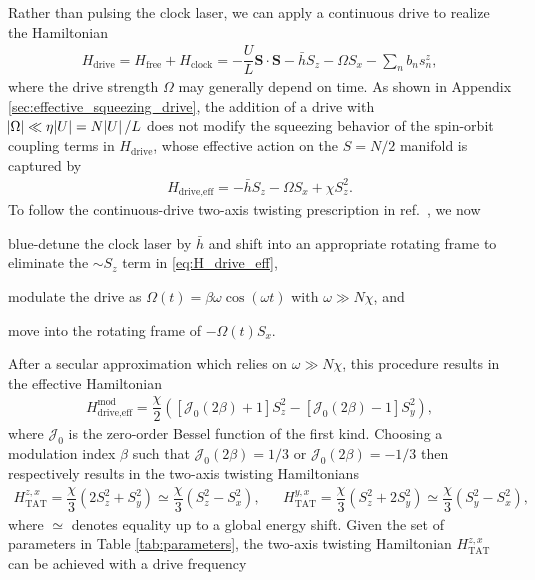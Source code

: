 \documentclass[aps,notitlepage,nofootinbib,11pt]{revtex4-1}
\renewcommand{\t}{\text} %
\newcommand{\f}[2]{\dfrac{#1}{#2}} %
\newcommand{\p}[1]{\left(#1\right)} %
\renewcommand{\sp}[1]{\left[#1\right]} %
\renewcommand{\v}{\bm} %
\renewcommand{\c}{\cdot} %
\newcommand{\J}{\mathcal{J}}
\newcommand{\1}{\hat{\mathds{1}}}
\begin{document}
Rather than pulsing the clock laser, we can apply a continuous drive
to realize the Hamiltonian
\begin{align}
  H_{\t{drive}} = H_{\t{free}} + H_{\t{clock}}
  = -\f{U}{L} \v S\c\v S - \bar h S_z - \Omega S_x - \sum_n b_n s_n^z,
\end{align}
where the drive strength $\Omega$ may generally depend on time.  As
shown in Appendix \ref{sec:effective_squeezing_drive}, the addition of
a drive with $\abs{\Omega}\ll\eta\abs{U}=N\abs{U}/L$ does not modify
the squeezing behavior of the spin-orbit coupling terms in
$H_{\t{drive}}$, whose effective action on the $S=N/2$ manifold is
captured by
\begin{align}
  H_{\t{drive,eff}} = -\bar h S_z - \Omega S_x + \chi S_z^2.
  \label{eq:H_drive_eff}
\end{align}
To follow the continuous-drive two-axis twisting prescription in
ref.~\cite{huang2015twoaxis}, we now
\begin{enumerate*}[label=(\roman*)]
\item blue-detune the clock laser by $\bar h$ and shift into an
  appropriate rotating frame to eliminate the $\sim S_z$ term in
  \eqref{eq:H_drive_eff},
\item modulate the drive as $\Omega\p{t}=\beta\omega\cos\p{\omega t}$
  with $\omega\gg N\chi$, and
\item move into the rotating frame of $-\Omega\p{t}S_x$.
\end{enumerate*}
After a secular approximation which relies on $\omega\gg N\chi$, this
procedure results in the effective Hamiltonian
\begin{align}
  H_{\t{drive,eff}}^{\t{mod}}
  = \f{\chi}{2} \p{\sp{\J_0\p{2\beta}+1} S_z^2
    - \sp{\J_0\p{2\beta}-1} S_y^2},
\end{align}
where $\J_0$ is the zero-order Bessel function of the first kind.
Choosing a modulation index $\beta$ such that $\J_0\p{2\beta}=1/3$ or
$\J_0\p{2\beta}=-1/3$ then respectively results in the two-axis
twisting Hamiltonians
\begin{align}
  H_{\t{TAT}}^{z,x}
  = \f{\chi}{3} \p{2 S_z^2 + S_y^2}
  \simeq \f{\chi}{3} \p{S_z^2 - S_x^2},
  &&
  H_{\t{TAT}}^{y,x}
  = \f{\chi}{3} \p{S_z^2 + 2 S_y^2}
  \simeq \f{\chi}{3}\p{S_y^2 - S_x^2},
  \label{eq:H_TAT_drive}
\end{align}
where $\simeq$ denotes equality up to a global energy shift. Given the
set of parameters in Table \ref{tab:parameters}, the two-axis twisting
Hamiltonian $H_{\t{TAT}}^{z,x}$ can be achieved with a drive frequency
\end{document}
